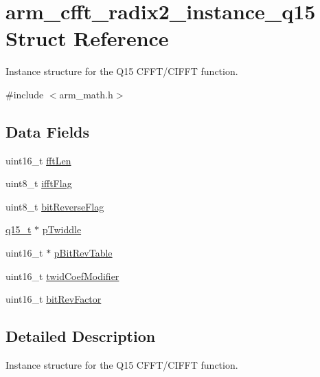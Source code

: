 \hypertarget{structarm__cfft__radix2__instance__q15}{}\section{arm\+\_\+cfft\+\_\+radix2\+\_\+instance\+\_\+q15 Struct Reference}
\label{structarm__cfft__radix2__instance__q15}


Instance structure for the Q15 C\+F\+F\+T/\+C\+I\+F\+FT function.  




{\ttfamily \#include $<$arm\+\_\+math.\+h$>$}

\subsection*{Data Fields}
\begin{DoxyCompactItemize}
\item 
uint16\+\_\+t \mbox{\hyperlink{structarm__cfft__radix2__instance__q15_ab8db3bbe7c61e6bb8ca2a55e3446e11a}{fft\+Len}}
\item 
uint8\+\_\+t \mbox{\hyperlink{structarm__cfft__radix2__instance__q15_ad6ca6e223f986ebfd94c5ee1e410aa73}{ifft\+Flag}}
\item 
uint8\+\_\+t \mbox{\hyperlink{structarm__cfft__radix2__instance__q15_a09a221a818c6d0e064557a99e2fe9a8b}{bit\+Reverse\+Flag}}
\item 
\mbox{\hyperlink{arm__math_8h_ab5a8fb21a5b3b983d5f54f31614052ea}{q15\+\_\+t}} $\ast$ \mbox{\hyperlink{structarm__cfft__radix2__instance__q15_aa8c837c05b2c910342ab8f171d30dc02}{p\+Twiddle}}
\item 
uint16\+\_\+t $\ast$ \mbox{\hyperlink{structarm__cfft__radix2__instance__q15_a46a2fb328199897af100fea0bfdf59aa}{p\+Bit\+Rev\+Table}}
\item 
uint16\+\_\+t \mbox{\hyperlink{structarm__cfft__radix2__instance__q15_afe772e5b5001c9d8e85032115a8df5bf}{twid\+Coef\+Modifier}}
\item 
uint16\+\_\+t \mbox{\hyperlink{structarm__cfft__radix2__instance__q15_a33386d95319dc3ee7097b3a8e52e01ec}{bit\+Rev\+Factor}}
\end{DoxyCompactItemize}


\subsection{Detailed Description}
Instance structure for the Q15 C\+F\+F\+T/\+C\+I\+F\+FT function. 


